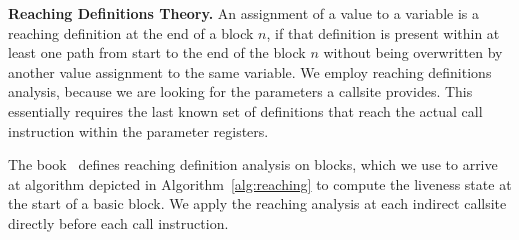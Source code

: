 \textbf{Reaching Definitions Theory.}
\label{subsection:reachindefinitionstheory}
An assignment of a value to a variable is a reaching definition at the end of a block $n$, if that definition is present within at 
least one path from start to the end of the block $n$ without being overwritten by another value assignment to the same variable. 
We employ reaching definitions analysis, because we are looking for the parameters a callsite provides. This essentially 
requires the last known set of definitions that reach the actual call instruction within the parameter registers.



%
%
The book~\cite{khedker2009data} defines reaching definition analysis on blocks, which we use to arrive at algorithm depicted in Algorithm~\ref{alg:reaching} to compute 
the liveness state at the start of a basic block. We apply the reaching analysis at each indirect callsite directly before each call instruction.

